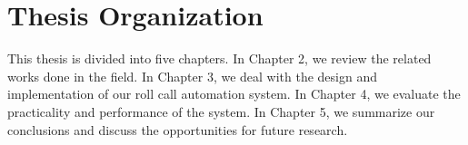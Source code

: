 \section{Thesis Organization}
This thesis is divided into five chapters.
In Chapter 2, we review the related works done in the field.
In Chapter 3, we deal with the design and implementation of our roll call automation system.
In Chapter 4, we evaluate the practicality and performance of the system.
In Chapter 5, we summarize our conclusions and discuss the opportunities for future research.
